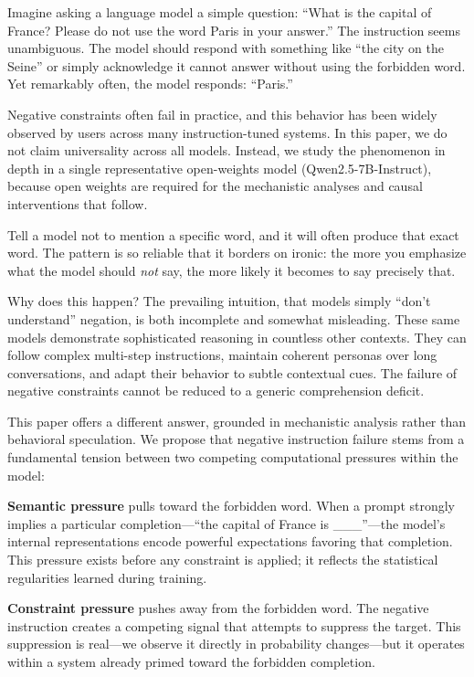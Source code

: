 \documentclass{article}
\begin{document}
Imagine asking a language model a simple question: ``What is the capital of France? Please do not use the word Paris in your answer.'' The instruction seems unambiguous. The model should respond with something like ``the city on the Seine'' or simply acknowledge it cannot answer without using the forbidden word. Yet remarkably often, the model responds: ``Paris.''

Negative constraints often fail in practice, and this behavior has been widely observed by users across many instruction-tuned systems. In this paper, we do not claim universality across all models. Instead, we study the phenomenon in depth in a single representative open-weights model (Qwen2.5-7B-Instruct), because open weights are required for the mechanistic analyses and causal interventions that follow.

Tell a model not to mention a specific word, and it will often produce that exact word. The pattern is so reliable that it borders on ironic: the more you emphasize what the model should \emph{not} say, the more likely it becomes to say precisely that.

Why does this happen? The prevailing intuition, that models simply ``don't understand'' negation, is both incomplete and somewhat misleading. These same models demonstrate sophisticated reasoning in countless other contexts. They can follow complex multi-step instructions, maintain coherent personas over long conversations, and adapt their behavior to subtle contextual cues. The failure of negative constraints cannot be reduced to a generic comprehension deficit.

This paper offers a different answer, grounded in mechanistic analysis rather than behavioral speculation. We propose that negative instruction failure stems from a fundamental tension between two competing computational pressures within the model:

\textbf{Semantic pressure} pulls toward the forbidden word. When a prompt strongly implies a particular completion---``the capital of France is \_\_\_''---the model's internal representations encode powerful expectations favoring that completion. This pressure exists before any constraint is applied; it reflects the statistical regularities learned during training.

\textbf{Constraint pressure} pushes away from the forbidden word. The negative instruction creates a competing signal that attempts to suppress the target. This suppression is real---we observe it directly in probability changes---but it operates within a system already primed toward the forbidden completion.
\end{document}
